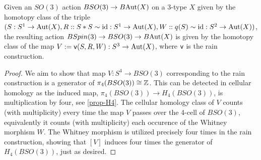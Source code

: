 \documentclass{amsart}
\begin{document}
%


\begin{prop}
\label{prop:spin3}
Given an $SO(3)$ action $BSO(3) \rightarrow B\mathrm{Aut}(X)$ on a 3-type $X$ given by the homotopy class of the triple $(S: S^1 \to \mathrm{Aut}(X),R:: S \ast S \sim \mathrm{id} : S^1 \to \mathrm{Aut}(X),W:: q(S) \sim \mathrm{id} : S^2 \to \mathrm{Aut}(X))$, the resulting action $BSpin(3) \rightarrow BSO(3) \rightarrow B\mathrm{Aut}(X)$ is given by the homotopy class of the map $V := \mathsf{v}(S,R,W) : S^3 \rightarrow \mathrm{Aut}(X)$, where $\mathsf{v}$ is the rain construction.
\end{prop}


\begin{proof}
	We aim to show that map $V:S^4 \to BSO(3)$ corresponding to the rain construction is a generator of $\pi_4(BSO(3)) \cong \mathbb Z$. This can be detected in cellular homology as the induced map, $\pi_4(BSO(3)) \to H_4(BSO(3))$, is multiplication by four, see \cref{prop-H4}. The cellular homology class of $V$ counts (with multiplicity) every time the map $V$ passes over the 4-cell of $BSO(3)$, equivalently it counts
	(with multiplicity) each occurence of the Whitney morphism $W$. The Whitney morphism is utilized precisely four times in the rain construction, showing that $[V]$ induces four times the generator of $H_4(BSO(3))$, just as desired. 
\end{proof}
\end{document}
